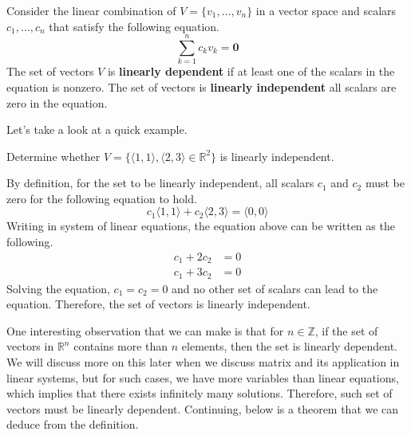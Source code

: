 \documentclass[../main.tex]{subfiles}
\begin{document}
\begin{definition}
Consider the linear combination of $V = \{ v_1, \ldots, v_n \}$
in a vector space and scalars $c_1, \ldots, c_n$ that satisfy the
following equation.
\[
\sum_{k = 1}^n c_k v_k = \mathbf{0}
\]
The set of vectors $V$ is \textbf{linearly dependent} if at least
one of the scalars in the equation is nonzero. The set of vectors is
\textbf{linearly independent} all scalars are zero in the equation.
\end{definition}

Let's take a look at a quick example.

\begin{problem}
Determine whether $V = \{ \langle 1, 1 \rangle, \langle 2, 3\rangle
\in \mathbb{R}^2 \}$ is linearly independent.
\end{problem}
\begin{solution}
By definition, for the set to be linearly independent, all scalars
$c_1$ and $c_2$ must be zero for the following equation to hold.
\[
c_1 \langle 1, 1 \rangle + c_2 \langle 2, 3 \rangle
= \langle 0, 0 \rangle
\]
Writing in system of linear equations, the equation above can
be written as the following.
\begin{align*}
    c_1 + 2c_2 &= 0 \\
    c_1 + 3c_2 &= 0
\end{align*}
Solving the equation, $c_1 = c_2 = 0$ and no other set of scalars
can lead to the equation. Therefore, the set of vectors is linearly
independent.
\end{solution}

One interesting observation that we can make is that for $n \in
\mathbb{Z}$, if the set of vectors in $\mathbb{R}^n$ contains more
than $n$ elements, then the set is linearly dependent. We will
discuss more on this later when we discuss matrix and its application
in linear systems, but for such cases, we have more variables than
linear equations, which implies that there exists infinitely many
solutions. Therefore, such set of vectors must be linearly dependent.
Continuing, below is a theorem that we can deduce from the definition.
\end{document}
